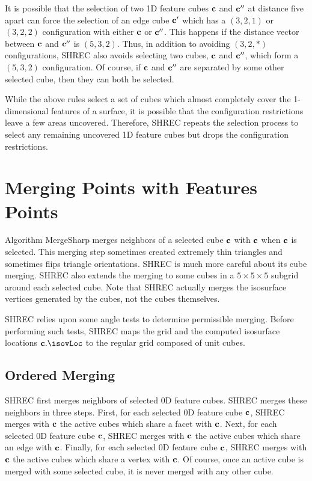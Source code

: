 It is possible that the selection of two 1D feature cubes $\mathbf{c}$ and $\mathbf{c}''$
at distance five apart can force the selection of an edge cube $\mathbf{c}'$
which has a $(3,2,1)$ or $(3,2,2)$ configuration 
with either $\mathbf{c}$ or $\mathbf{c}''$.
This happens if the distance vector between $\mathbf{c}$ and $\mathbf{c}''$
is $(5,3,2)$.
Thus, in addition to avoiding $(3,2,*)$ configurations,
SHREC also avoids selecting two cubes, $\mathbf{c}$ and $\mathbf{c}''$, 
which form a $(5,3,2)$ configuration.
Of course, if $\mathbf{c}$ and $\mathbf{c}''$ are separated by some other selected cube,
then they can both be selected.

While the above rules select a set of cubes which almost completely cover
the 1-dimensional features of a surface,
it is possible that the configuration restrictions leave a few areas uncovered.
Therefore, SHREC repeats the selection process to select any remaining
uncovered 1D feature cubes but drops the configuration restrictions.


\section{Merging Points with Features Points}
\label{section:merging}

Algorithm MergeSharp merges neighbors of a selected cube $\mathbf{c}$ 
with $\mathbf{c}$ when $\mathbf{c}$ is selected.
This merging step sometimes created extremely thin triangles and 
sometimes flips triangle orientations.
SHREC is much more careful about its cube merging.
SHREC also extends the merging to some cubes in a $5 \times 5 \times 5$ subgrid 
around each selected cube.
Note that SHREC actually merges the isosurface vertices generated by the cubes,
not the cubes themselves.

SHREC relies upon some angle tests to determine permissible merging.
Before performing such tests, SHREC maps the grid 
and the computed isosurface locations $\cb.\isovLoc$
to the regular grid composed of unit cubes.

\subsection{Ordered Merging}
\label{section:ordered_merging}

SHREC first merges neighbors of selected 0D feature cubes.
SHREC merges these neighbors in three steps.
First, for each selected 0D feature cube $\mathbf{c}$,
SHREC merges with $\mathbf{c}$ the active cubes which share a facet with $\mathbf{c}$.
Next, for each selected 0D feature cube $\mathbf{c}$,
SHREC merges with $\mathbf{c}$ the active cubes which share an edge with $\mathbf{c}$.
Finally, for each selected 0D feature cube $\mathbf{c}$,
SHREC merges with $\mathbf{c}$ the active cubes which share a vertex with $\mathbf{c}$.
Of course, once an active cube is merged with some selected cube,
it is never merged with any other cube.

